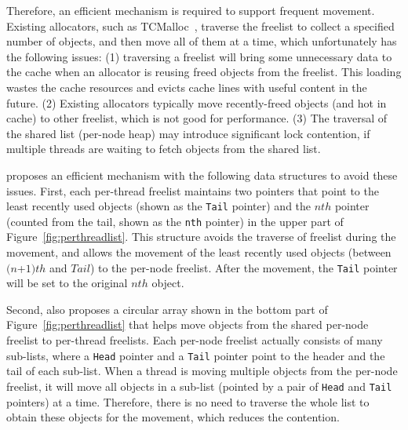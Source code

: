 Therefore, an efficient mechanism is required to support frequent movement. Existing allocators, such as TCMalloc~\cite{tcmalloc}, traverse the freelist to collect a specified number of objects, and then move all of them at a time, which unfortunately has the following issues: (1) traversing a freelist will bring some unnecessary data to the cache when an allocator is reusing freed objects from the freelist. This loading wastes the cache resources and evicts cache lines with useful content in the future. 
(2) Existing allocators typically move recently-freed objects (and hot in cache) to other freelist, which is not good for performance. (3) The traversal of the shared list (per-node heap) may introduce significant lock contention, if multiple threads are waiting to fetch objects from the shared list. 

\NM{} proposes an efficient mechanism with the following data structures to avoid these issues. First, each per-thread freelist maintains two pointers that point to the least recently used objects (shown as the \texttt{Tail} pointer) and the $nth$ pointer (counted from the tail, shown as the \texttt{nth} pointer) in the upper part of Figure~\ref{fig:perthreadlist}. 
This structure avoids the traverse of freelist during the movement, and allows the movement of the least recently used objects (between $(n$+$1)th$ and $Tail$) to the per-node freelist. After the movement, the \texttt{Tail} pointer will be set to the original $nth$ object.

Second, \NM{} also proposes a circular array shown in the bottom part of Figure~\ref{fig:perthreadlist} that helps move objects from the shared per-node  freelist to per-thread freelists. 
Each per-node freelist actually consists of many sub-lists, where a \texttt{Head} pointer and a \texttt{Tail} pointer point to the header and the tail of each sub-list. When a thread is moving multiple objects from the per-node freelist, it will move all objects in a sub-list (pointed by a pair of \texttt{Head} and \texttt{Tail} pointers) at a time. Therefore, there is no need to traverse the whole list to obtain these objects for the movement, which reduces the contention. 





